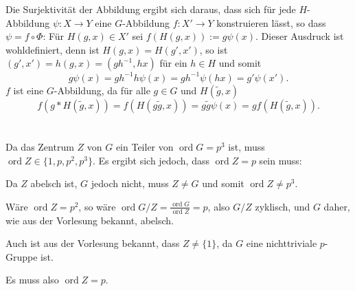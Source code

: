 \documentclass[a4paper,10pt]{article}
\theoremstyle{definition}
\newcommand{\ord}{\operatorname{ord}}
\begin{document}
Die Surjektivität der Abbildung ergibt sich daraus, dass sich für jede $H$-Abbildung $\psi : X \rightarrow Y$ eine $G$-Abbildung $f : X' \rightarrow Y$ konstruieren lässt, so dass $\psi = f \circ \Phi$: Für $H(g,x) \in X'$ sei $f(H(g,x)) :=  g \psi(x)$. Dieser Ausdruck ist wohldefiniert, denn ist $H(g,x) = H(g',x')$, so ist $(g',x') = h(g,x) = (gh^{-1},hx)$ für ein $h \in H$ und somit
\[
 g \psi(x) = g h^{-1} h \psi(x) = g h^{-1} \psi(hx) = g' \psi(x').
\]
$f$ ist eine $G$-Abbildung, da für alle $g \in G$ und $H(\tilde{g},x)$
\[
 f( g * H(\tilde{g},x) )
 = f( H(g\tilde{g}, x) )
 = g \tilde{g} \psi(x)
 = g f( H(\tilde{g},x) ).
\]





\section{}





\section{}





\section{}





\section{}
Da das Zentrum $Z$ von $G$ ein Teiler von $\ord G = p^3$ ist, muss $\ord Z \in \{1, p, p^2, p^3\}$. Es ergibt sich jedoch, dass $\ord Z = p$ sein muss:

Da $Z$ abelsch ist, $G$ jedoch nicht, muss $Z \neq G$ und somit $\ord Z \neq p^3$.

Wäre $\ord Z = p^2$, so wäre $\ord G/Z = \frac{\ord G}{\ord Z} = p$, also $G/Z$ zyklisch, und $G$ daher, wie aus der Vorlesung bekannt, abelsch.

Auch ist aus der Vorlesung bekannt, dass $Z \neq \{1\}$, da $G$ eine nichttriviale $p$-Gruppe ist.

Es muss also $\ord Z = p$.
\end{document}
